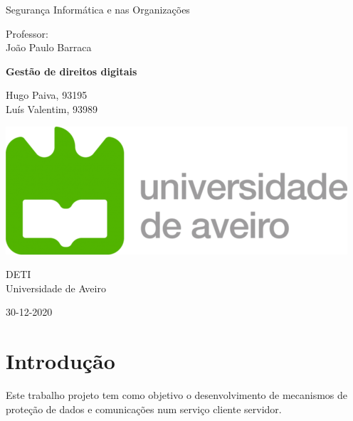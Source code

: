 \documentclass[10pt,english]{article}
\begin{document}
\begin{titlepage}
	\clearpage\thispagestyle{empty}
	\centering
	\vspace{2cm}

	
	{\Large  Segurança Informática e nas Organizações \par}
	\vspace{0.5cm}
	{\small Professor: \\
	João Paulo Barraca\par}
	\vspace{4cm}
	{\Huge \textbf{Gestão de direitos digitais}} \\
	\vspace{1cm}
	\vspace{4cm}
	{\normalsize Hugo Paiva, 93195 \\ 
	             Luís Valentim, 93989
	   \par}
	\vspace{2cm}

    \includegraphics[scale=0.20]{logo_ua.png}
    
    \vspace{2cm}
    
	{\normalsize DETI \\ 
		Universidade de Aveiro \par}
		
	{\normalsize 30-12-2020 \par}
	\vspace{2cm}
		
	
	\pagebreak

\end{titlepage}
\tableofcontents{}
\clearpage

\section{Introdução}
\par Este trabalho projeto tem como objetivo o desenvolvimento de mecanismos de proteção de dados e comunicações num serviço cliente servidor.
\end{document}
